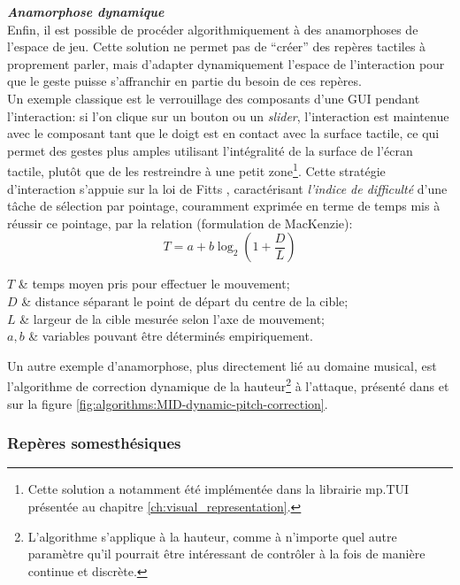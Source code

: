 \noindent\textbf{\textit{Anamorphose dynamique}}\\
\noindent Enfin, il est possible de procéder algorithmiquement à des anamorphoses de l'espace de jeu. Cette solution ne permet pas de ``créer'' des repères tactiles à proprement parler, mais d'adapter dynamiquement l'espace de l'interaction pour que le geste puisse s'affranchir en partie du besoin de ces repères.\\
\indent Un exemple classique est le verrouillage des composants d'une \gls{GUI} pendant l'interaction: si l'on clique sur un bouton ou un \textit{slider}, l'interaction est maintenue avec le composant tant que le doigt est en contact avec la surface tactile, ce qui permet des gestes plus amples utilisant l'intégralité de la surface de l'écran tactile, plutôt que de les restreindre à une petit zone\footnote{Cette solution a notamment été implémentée dans la librairie mp.TUI présentée au chapitre \ref{ch:visual_representation}.}. Cette stratégie d'interaction s'appuie sur la loi de Fitts \cite{fitts_information_1954}, caractérisant \textit{l'indice de difficulté} d'une tâche de sélection par pointage, couramment exprimée en terme de temps mis à réussir ce pointage, par la relation (formulation de MacKenzie): 
$$ T = a + b \log_2 (1 + \frac{D}{L})$$
\vspace{-1em}
\begin{conditions}
$T$     	& temps moyen pris pour effectuer le mouvement; \\
$D$			& distance séparant le point de départ du centre de la cible;\\
$L$			& largeur de la cible mesurée selon l'axe de mouvement;\\
$a, b$  	& variables pouvant être déterminés empiriquement.
\end{conditions}

\noindent Un autre exemple d'anamorphose, plus directement lié au domaine musical, est l'algorithme de correction dynamique de la hauteur\footnote{L'algorithme s'applique à la hauteur, comme à n'importe quel autre paramètre qu'il pourrait être intéressant de contrôler à la fois de manière continue et discrète.} à l'attaque, présenté dans \cite{goudard_playing_2014} et sur la figure \ref{fig:algorithms:MID-dynamic-pitch-correction}.

\subsubsection{Repères somesthésiques}

